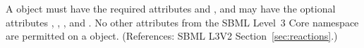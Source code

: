 A \SpeciesReference object must have the required attributes
 and , and may have the optional attributes
, , ,  and
.  No other attributes from the SBML Level~3 Core
namespace are permitted on a \SpeciesReference object.  (References: SBML
L3V2 Section~\ref{sec:reactions}.)
